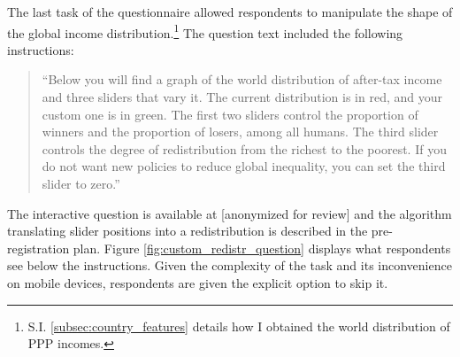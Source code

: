 \documentclass[12pt,english]{article}
\begin{document}
\begin{bibunit}
The last task of the questionnaire allowed respondents to manipulate the shape of the global income distribution.\footnote{S.I. \ref{subsec:country_features} details how I obtained the world distribution of PPP incomes.} The question text included the following instructions:
\begin{quote}``Below you will find a graph of the world distribution of after-tax income and three sliders that vary it. The current distribution is in red, and your custom one is in green. The first two sliders control the proportion of winners and the proportion of losers, among all humans. The third slider controls the degree of redistribution from the richest to the poorest.
If you do not want new policies to reduce global inequality, you can set the third slider to zero.''\end{quote}
The interactive question is available at [anonymized for review] %
and the algorithm translating slider positions into a redistribution is described in the pre-registration plan. %
Figure \ref{fig:custom_redistr_question} displays what respondents see below the instructions. 
Given the complexity of the task and its inconvenience on mobile devices, respondents are given the explicit option to skip it.



\end{bibunit}
\end{document}
